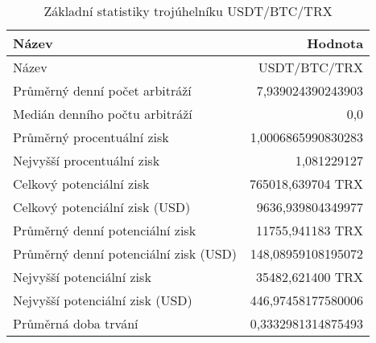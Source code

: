 \begin{table}\centering
\caption{Základní statistiky trojúhelníku USDT/BTC/TRX}
\label{USDTBTCTRX_stats}
\begin{tabular}{|| l | r ||}
\hline Název & Hodnota \\ 
\hline\hline Název & USDT/BTC/TRX \\ 
\hline Průměrný denní počet arbitráží & 7,939024390243903 \\ 
\hline Medián denního počtu arbitráží & 0,0 \\ 
\hline Průměrný procentuální zisk & 1,0006865990830283 \\ 
\hline Nejvyšší procentuální zisk & 1,081229127 \\ 
\hline Celkový potenciální zisk & 765018,639704 TRX \\ 
\hline Celkový potenciální zisk (USD) & 9636,939804349977 \\ 
\hline Průměrný denní potenciální zisk & 11755,941183 TRX \\ 
\hline Průměrný denní potenciální zisk (USD) & 148,08959108195072 \\ 
\hline Nejvyšší potenciální zisk & 35482,621400 TRX \\ 
\hline Nejvyšší potenciální zisk (USD) & 446,97458177580006 \\ 
\hline Průměrná doba trvání & 0,3332981314875493 \\ 
\hline
\end{tabular}
\end{table}